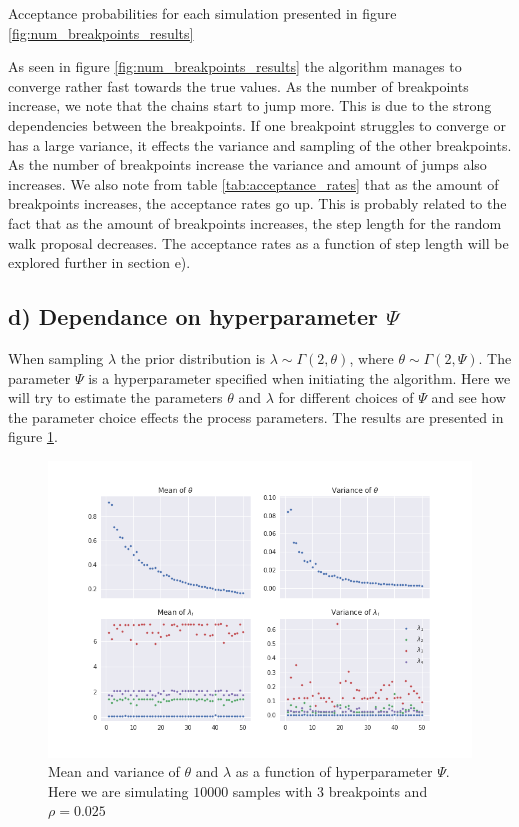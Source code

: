 \documentclass[a4paper]{article}
\begin{document}
\begin{table}
    \centering
    \caption{Acceptance probabilities for each simulation presented in figure \ref{fig:num_breakpoints_results}}
    \label{tab:acceptance_rates}
    
\end{table}

As seen in figure \ref{fig:num_breakpoints_results} the algorithm manages to converge rather fast towards the true values. As the number of breakpoints increase, we note that the chains start to jump more. This is due to the strong dependencies between the breakpoints. If one breakpoint struggles to converge or has a large variance, it effects the variance and sampling of the other breakpoints. As the number of breakpoints increase the variance and amount of jumps also increases. We also note from table \ref{tab:acceptance_rates} that as the amount of breakpoints increases, the acceptance rates go up. This is probably related to the fact that as the amount of breakpoints increases, the step length for the random walk proposal decreases. The acceptance rates as a function of step length will be explored further in section e).

\subsection*{d) Dependance on hyperparameter $\Psi$}
When sampling $\lambda$ the prior distribution is  $\lambda \sim \Gamma(2,\theta)$, where $\theta \sim \Gamma(2,\Psi)$. The parameter $\Psi$ is a hyperparameter specified when initiating the algorithm. Here we will try to estimate the parameters $\theta$ and $\lambda$ for different choices of $\Psi$ and see how the parameter choice effects the process parameters. The results are presented in figure \ref{fig:different_psi}.

\begin{figure}[H]
    \centering
    \includegraphics[width = 1.0\textwidth]{images/psi.png} 
    \caption{Mean and variance of $\theta$ and $\lambda$ as a function of hyperparameter $\Psi$. Here we are simulating $10 000$ samples with 3 breakpoints and $\rho = 0.025$}
    \label{fig:different_psi}
\end{figure}
\end{document}
